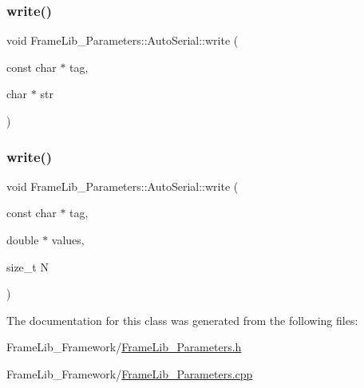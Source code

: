 \subsubsection{\texorpdfstring{write()}{write()}\hspace{0.1cm}{\footnotesize\ttfamily [2/3]}}
{\footnotesize\ttfamily void Frame\+Lib\+\_\+\+Parameters\+::\+Auto\+Serial\+::write (\begin{DoxyParamCaption}\item[{const char $\ast$}]{tag,  }\item[{char $\ast$}]{str }\end{DoxyParamCaption})\hspace{0.3cm}{\ttfamily [inline]}}

\mbox{\label{class_frame_lib___parameters_1_1_auto_serial_a3066854fc6c246174b311f3849426a36}} 
\subsubsection{\texorpdfstring{write()}{write()}\hspace{0.1cm}{\footnotesize\ttfamily [3/3]}}
{\footnotesize\ttfamily void Frame\+Lib\+\_\+\+Parameters\+::\+Auto\+Serial\+::write (\begin{DoxyParamCaption}\item[{const char $\ast$}]{tag,  }\item[{double $\ast$}]{values,  }\item[{size\+\_\+t}]{N }\end{DoxyParamCaption})\hspace{0.3cm}{\ttfamily [inline]}}



The documentation for this class was generated from the following files\+:\begin{DoxyCompactItemize}
\item 
Frame\+Lib\+\_\+\+Framework/\hyperlink{_frame_lib___parameters_8h}{Frame\+Lib\+\_\+\+Parameters.\+h}\item 
Frame\+Lib\+\_\+\+Framework/\hyperlink{_frame_lib___parameters_8cpp}{Frame\+Lib\+\_\+\+Parameters.\+cpp}\end{DoxyCompactItemize}
